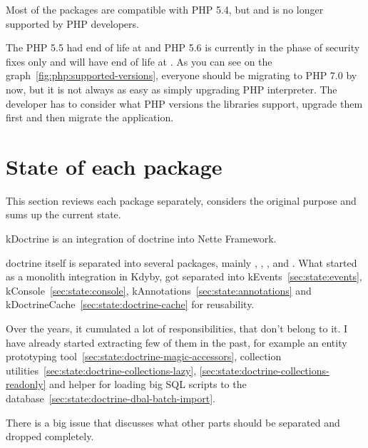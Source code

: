Most of the packages are compatible with PHP 5.4, but  and is no longer supported by PHP developers.

The PHP 5.5 had end of life at  and PHP 5.6 is currently in the phase of security fixes only and will have end of life at . As you can see on the graph~\ref{fig:php:supported-versions}, everyone should be migrating to PHP 7.0 by now, but it is not always as easy as simply upgrading PHP interpreter. The developer has to consider what PHP versions the libraries support, upgrade them first and then migrate the application.

\section{State of each package}

This section reviews each package separately, considers the original purpose and sums up the current state.

 \label{sec:state:doctrine}

\gls{kDoctrine} is an integration of \gls{doctrine} into Nette Framework.

\gls{doctrine} itself is separated into several packages, mainly , , ,  and . What started as a monolith integration in Kdyby, got separated into \gls{kEvents}~\ref{sec:state:events}, \gls{kConsole}~\ref{sec:state:console}, \gls{kAnnotations}~\ref{sec:state:annotations} and \gls{kDoctrineCache}~\ref{sec:state:doctrine-cache} for reusability.

Over the years, it cumulated a lot of responsibilities, that don't belong to it. I have already started extracting few of them in the past, for example an entity prototyping tool~\ref{sec:state:doctrine-magic-accessors}, collection utilities~\ref{sec:state:doctrine-collections-lazy}, \ref{sec:state:doctrine-collections-readonly} and helper for loading big SQL scripts to the database~\ref{sec:state:doctrine-dbal-batch-import}.

There is a big issue  that discusses what other parts should be separated and dropped completely.

